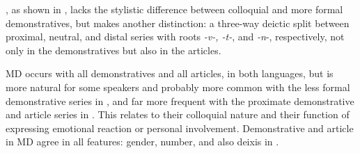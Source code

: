 \documentclass[output=paper]{langscibook}
\begin{document}

, as shown in , lacks the stylistic difference between colloquial and more formal demonstratives, but makes another distinction: a three-way deictic split between proximal, neutral, and distal series with roots \textit{-v-, -t-}, and \textit{-n}-, respectively, not only in the demonstratives but also in the articles.

MD occurs with all demonstratives and all articles, in both languages, but is more natural for some speakers and probably more common with the less formal demonstrative series in , and far more frequent with the proximate demonstrative and article series in . This relates to their colloquial nature and their function of expressing emotional reaction or personal involvement. Demonstrative and article in MD agree in all features: gender, number, and also deixis in .
\end{document}
